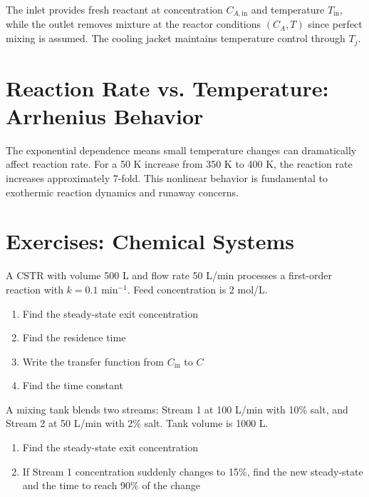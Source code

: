 

The inlet provides fresh reactant at concentration $C_{A,\text{in}}$ and temperature $T_{\text{in}}$, while the outlet removes mixture at the reactor conditions $(C_A, T)$ since perfect mixing is assumed. The cooling jacket maintains temperature control through $T_j$.

\section{Reaction Rate vs. Temperature: Arrhenius Behavior}
\label{sec:reaction_rate_temperature}



The exponential dependence means small temperature changes can dramatically affect reaction rate. For a 50 K increase from 350 K to 400 K, the reaction rate increases approximately 7-fold. This nonlinear behavior is fundamental to exothermic reaction dynamics and runaway concerns.

\section{Exercises: Chemical Systems}

\begin{exercise}
A CSTR with volume 500 L and flow rate 50 L/min processes a first-order reaction with $k = 0.1$ min$^{-1}$. Feed concentration is 2 mol/L.
\begin{enumerate}[label=(\alph*)]
    \item Find the steady-state exit concentration
    \item Find the residence time
    \item Write the transfer function from $C_{\text{in}}$ to $C$
    \item Find the time constant
\end{enumerate}
\end{exercise}

\begin{exercise}
A mixing tank blends two streams: Stream 1 at 100 L/min with 10\% salt, and Stream 2 at 50 L/min with 2\% salt. Tank volume is 1000 L.
\begin{enumerate}[label=(\alph*)]
    \item Find the steady-state exit concentration
    \item If Stream 1 concentration suddenly changes to 15\%, find the new steady-state and the time to reach 90\% of the change
\end{enumerate}
\end{exercise}

